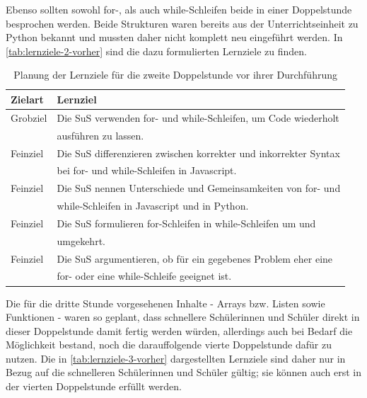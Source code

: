 Ebenso sollten sowohl for-, als auch while-Schleifen beide in einer Doppelstunde besprochen werden.
Beide Strukturen waren bereits aus der Unterrichtseinheit zu Python bekannt und mussten daher nicht komplett neu eingeführt werden.
In \autoref{tab:lernziele-2-vorher} sind die dazu formulierten Lernziele zu finden.

\begin{table}[h!]
\begin{tabular*}{\linewidth}{l|l}
	\hline
	\textbf{Zielart} & \textbf{Lernziel}\\
	\hline \hline
	Grobziel & Die SuS verwenden for- und while-Schleifen, um Code wiederholt\\
	& ausführen zu lassen.\\
	Feinziel & Die SuS differenzieren zwischen korrekter und inkorrekter Syntax\\
	& bei for- und while-Schleifen in Javascript.\\
	Feinziel & Die SuS nennen Unterschiede und Gemeinsamkeiten von for- und\\
	& while-Schleifen in Javascript und in Python.\\
	Feinziel & Die SuS formulieren for-Schleifen in while-Schleifen um und\\
	& umgekehrt.\\
	Feinziel & Die SuS argumentieren, ob für ein gegebenes Problem eher eine\\
	& for- oder eine while-Schleife geeignet ist.\\
	\hline
\end{tabular*}
\caption{Planung der Lernziele für die zweite Doppelstunde vor ihrer Durchführung}
\label{tab:lernziele-2-vorher}
\end{table}

Die für die dritte Stunde vorgesehenen Inhalte - Arrays bzw. Listen sowie Funktionen - waren so geplant, dass schnellere Schülerinnen und Schüler direkt in dieser Doppelstunde damit fertig werden würden, allerdings auch bei Bedarf die Möglichkeit bestand, noch die darauffolgende vierte Doppelstunde dafür zu nutzen.
Die in \autoref{tab:lernziele-3-vorher} dargestellten Lernziele sind daher nur in Bezug auf die schnelleren Schülerinnen und Schüler gültig; sie können auch erst in der vierten Doppelstunde erfüllt werden.

